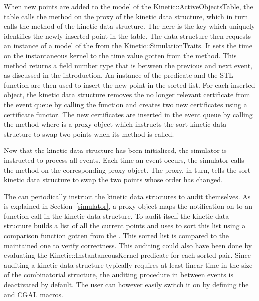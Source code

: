 When new points are added to the model of the
Kinetic::ActiveObjectsTable, the table calls the
 method on the proxy of the kinetic data
structure, which in turn calls the
 method of the kinetic data structure. The
 here is the key which uniquely identifies the
newly inserted point in the table. The data structure then requests an
instance of a model of the  from the
Kinetic::SimulationTraits. It sets the time on the instantaneous
kernel to the time value gotten from the
 method. This method returns
a field number type that is between the previous and next event, as
discussed in the introduction. An instance of the
 predicate and the STL
function  are then used to insert the new
point in the sorted list. For each inserted object, the kinetic data
structure removes the no
longer relevant certificate from the event queue by calling the
 function and creates two new
certificates using a 
certificate functor. The new certificates are inserted in the event
queue by calling the 
method where  is a proxy object which instructs the sort
kinetic data structure to swap two points when its 
method is called.

Now that the kinetic data structure has been initialized, the
simulator is instructed to process all events. Each time an event
occurs, the simulator calls the  method on the
corresponding proxy object. The proxy, in turn, tells the sort kinetic
data structure to swap the two points whose order has changed.

The  can periodically instruct the kinetic data
structures to audit themselves.  As is explained in
Section~\ref{simulator}, a proxy object maps the notification on to an
 function call in the kinetic data structure. To audit
itself the kinetic data structure builds a list of all the current
points and uses  to sort this list using a
comparison function gotten from the .
This sorted list is compared to the maintained one to verify
correctness. This auditing could also have been done by evaluating the
Kinetic::InstantaneousKernel predicate for each sorted pair.  Since
auditing a kinetic data structure typically requires at least linear
time in the size of the combinatorial structure, the auditing
procedure in between events is deactivated by default.  The user can
however easily switch it on by defining the
 and  CGAL
macros.

